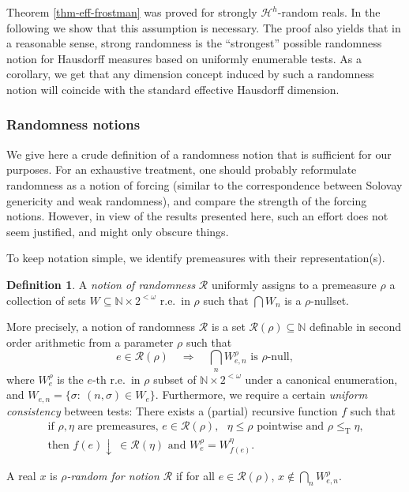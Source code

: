\documentclass[11pt,reqno]{article}
\theoremstyle{plain}
\theoremstyle{definition}
\newtheorem{defn}{Definition}
\theoremstyle{remark}
\numberwithin{equation}{section}
\newcommand{\Nat}{\ensuremath{\mathbb{N}}}
\newcommand{\Str}[1][<\omega]{\ensuremath{2^{#1}}}
\newcommand{\Hmeas}{\ensuremath{\mathcal{H}}}
\newcommand{\Hm}[1]{\ensuremath{\Hmeas^{#1}}}
\DeclareMathOperator{\T}{T}
\begin{document}
Theorem \ref{thm-eff-frostman} was proved for strongly $\Hm{h}$-random reals. In the following we show that this assumption is necessary. The proof also yields that in a reasonable sense, strong randomness is the ``strongest'' possible randomness notion for Hausdorff measures based on uniformly enumerable tests. As a corollary, we get that any dimension concept induced by such a randomness notion will coincide with the standard effective Hausdorff dimension.

\subsubsection*{Randomness notions} 
We give here a crude definition of a randomness notion that is sufficient for our purposes. For an exhaustive treatment, one should probably reformulate randomness as a notion of forcing (similar to the correspondence between Solovay genericity and weak randomness), and compare the strength of the forcing notions. However, in view of the results presented here, such an effort does not seem justified, and might only obscure things.

To keep notation simple, we identify premeasures with their representation(s). 

\begin{defn} \label{def-rand-notion}
	A \emph{notion of randomness} $\mathcal{R}$ uniformly assigns to a premeasure $\rho$ a collection of sets $W \subseteq \Nat \times \Str$ r.e.\ in $\rho$ such that $\bigcap W_n$ is a $\rho$-nullset.
	
	More precisely, a notion of randomness $\mathcal{R}$ is a set $\mathcal{R}(\rho) \subseteq \Nat$ definable in second order arithmetic from a parameter $\rho$ such that
	\[
 	 	e \in \mathcal{R}(\rho) \quad \Rightarrow \quad  \bigcap_n W^{\rho}_{e,n} \text{ is $\rho$-null},
	\] 
	where $W^\rho_e$ is the $e$-th r.e.\ in $\rho$ subset of $\Nat \times \Str$ under a canonical enumeration, and $W_{e,n} = \{ \sigma : \: (n, \sigma) \in W_e \}$. 
	Furthermore, we require a certain \emph{uniform consistency} between tests: There exists a (partial) recursive function $f$ such that
	\begin{multline*}
		 	 	\text{if $\rho,\eta$ are premeasures, } e \in \mathcal{R}(\rho), \text { $\eta \leq \rho$ pointwise and $\rho \leq_{\T} \eta$,}  \\
		\text{then } f(e)\downarrow\: \in \mathcal{R}(\eta) \text{ and } W^\rho_e = W^\eta_{f(e)}.
	\end{multline*}
	
	
	A real $x$ is \emph{$\rho$-random for notion $\mathcal{R}$} if for all $e \in \mathcal{R}(\rho)$, $x \not\in \bigcap_n W^{\rho}_{e,n}$.
\end{defn}
\end{document}
